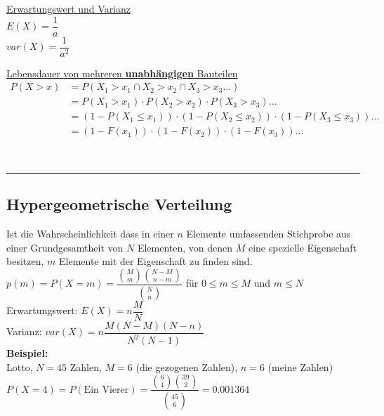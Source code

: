     
\begin{minipage}[t]{6cm}
  \underline{Erwartungswert und Varianz}\\[4pt]
  $E(X)=\dfrac{1}{a}$\\
  $var(X)=\dfrac{1}{a^2}$ 
\end{minipage}
\begin{minipage}[t]{9cm}
  \underline{Lebensdauer von mehreren \textbf{unabhängigen} Bauteilen}
  \begin{align}
    P(X>x) &= P(X_1>x_1 \cap X_2>x_2 \cap X_3>x_3 \ldots) \nonumber \\
    &= P(X_1>x_1) \cdot P(X_2>x_2) \cdot P(X_3>x_3) \ldots \nonumber \\
    &= (1-P(X_1\leq x_1)) \cdot (1-P(X_2\leq x_2)) \cdot (1-P(X_3\leq x_3)) \ldots \nonumber \\
    &= (1-F(x_1)) \cdot (1-F(x_2)) \cdot (1-F(x_3)) \ldots \nonumber
  \end{align}
\end{minipage}\\

		
	\hrule

\subsection{Hypergeometrische Verteilung}

      	
\begin{minipage}{0.7\textwidth}
	Ist die Wahrscheinlichkeit dass in einer $n$ Elemente umfassenden 
	Stichprobe aus einer Grundgesamtheit von $N$ Elementen, von denen $M$ eine
	spezielle Eigenschaft besitzen, $m$ Elemente mit der Eigenschaft zu
	finden sind.\\[5pt]
	$p(m)=P(X=m)=\dfrac{\binom M m \binom{N-M}{n-m}}{\binom N n}$ 
	\hspace{10mm} für $0\leq m \leq M$ und $m \leq N$\\
	Erwartungswert: \hspace{10mm} $E(X)=n \dfrac{M}{N}$\\[5pt]
	Varianz: \hspace{22mm} $var(X)=n \dfrac{M(N-M)(N-n)}{N^2(N-1)}$ \\
	{\bf Beispiel:} \\
	Lotto, $N=45$ Zahlen, $M=6$ (die gezogenen Zahlen), $n=6$
	(meine Zahlen) \\
	$P(X=4)=P(\text{Ein Vierer})=\dfrac{\binom 6 4 \binom {39}
	2}{\binom {45} 6}=0.001364$
\end{minipage}
\begin{minipage}{0.3\textwidth}
	
\end{minipage}


